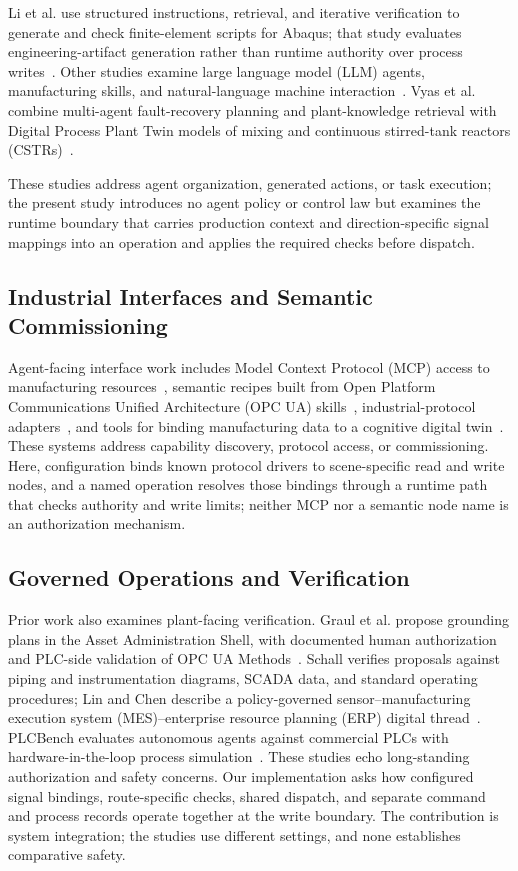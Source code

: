 Li et al. use structured instructions, retrieval, and iterative verification to generate and check finite-element scripts for Abaqus; that study evaluates engineering-artifact generation rather than runtime authority over process writes~\cite{li2026modsolagent}. Other studies examine large language model (LLM) agents, manufacturing skills, and natural-language machine interaction~\cite{koehle2026llmdriven,lim2025llmenabled,zhao2026shopfloor,hofmann2025nlc}. Vyas et al. combine multi-agent fault-recovery planning and plant-knowledge retrieval with Digital Process Plant Twin models of mixing and continuous stirred-tank reactors (CSTRs)~\cite{vyas2026detection}.

These studies address agent organization, generated actions, or task execution; the present study introduces no agent policy or control law but examines the runtime boundary that carries production context and direction-specific signal mappings into an operation and applies the required checks before dispatch.

\subsection{Industrial Interfaces and Semantic Commissioning}
Agent-facing interface work includes Model Context Protocol (MCP) access to manufacturing resources~\cite{silva2025mcpmanufacturing}, semantic recipes built from Open Platform Communications Unified Architecture (OPC UA) skills~\cite{koehle2025semanticrecipes}, industrial-protocol adapters~\cite{xavier2026industriConnect}, and tools for binding manufacturing data to a cognitive digital twin~\cite{liu2026semanticcommissioning}. These systems address capability discovery, protocol access, or commissioning. Here, configuration binds known protocol drivers to scene-specific read and write nodes, and a named operation resolves those bindings through a runtime path that checks authority and write limits; neither MCP nor a semantic node name is an authorization mechanism.

\subsection{Governed Operations and Verification}
Prior work also examines plant-facing verification. Graul et al. propose grounding plans in the Asset Administration Shell, with documented human authorization and PLC-side validation of OPC UA Methods~\cite{graul2026aas}. Schall verifies proposals against piping and instrumentation diagrams, SCADA data, and standard operating procedures; Lin and Chen describe a policy-governed sensor--manufacturing execution system (MES)--enterprise resource planning (ERP) digital thread~\cite{schall2026safe,lin2026agentic}. PLCBench evaluates autonomous agents against commercial PLCs with hardware-in-the-loop process simulation~\cite{zhou2026plcbench}. These studies echo long-standing authorization and safety concerns. Our implementation asks how configured signal bindings, route-specific checks, shared dispatch, and separate command and process records operate together at the write boundary. The contribution is system integration; the studies use different settings, and none establishes comparative safety.

